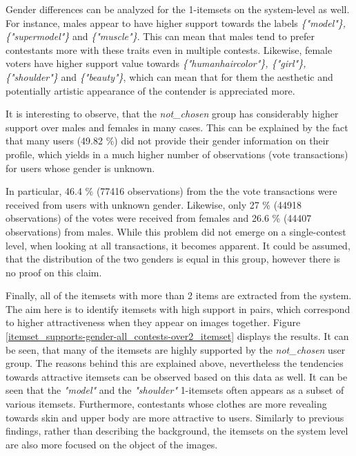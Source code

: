 Gender differences can be analyzed for the 1-itemsets on the system-level as well. For instance, males appear to have higher support towards the labels \emph{\{"model"\}, \{"supermodel"\}} and \emph{\{"muscle"\}}. This can mean that males tend to prefer contestants more with these traits even in multiple contests. Likewise, female voters have higher support value towards \emph{\{"human\:hair\:color"\}, \{"girl"\}, \{"shoulder"\}} and \emph{\{"beauty"\}}, which can mean that for them the aesthetic and potentially artistic appearance of the contender is appreciated more. 

It is interesting to observe, that the \emph{not\_chosen} group has considerably higher support over males and females in many cases. This can be explained by the fact that many users (49.82 \%) did not provide their gender information on their profile, which yields in a much higher number of observations (vote transactions) for users whose gender is unknown. 

In particular, 46.4 \% (77416 observations) from the the vote transactions were received from users with unknown gender. Likewise, only 27 \% (44918 observations) of the votes were received from females and 26.6 \% (44407 observations) from males. While this problem did not emerge on a single-contest level, when looking at all transactions, it becomes apparent. It could be assumed, that the distribution of the two genders is equal in this group, however there is no proof on this claim. 

Finally, all of the itemsets with more than 2 items are extracted from the system. The aim here is to identify itemsets with high support in pairs, which correspond to higher attractiveness when they appear on images together. Figure \ref{itemset_supports-gender-all_contests-over2_itemset} displays the results. It can be seen, that many of the itemsets are highly supported by the \emph{not\_chosen} user group. The reasons behind this are explained above, nevertheless the tendencies towards attractive itemsets can be observed based on this data as well. It can be seen that the \emph{"{model}"} and the \emph{"{shoulder}"} 1-itemsets often appears as a subset of various itemsets. Furthermore, contestants whose clothes are more revealing towards skin and upper body are more attractive to users. Similarly to previous findings, rather than describing the background, the itemsets on the system level are also more focused on the object of the images. 

